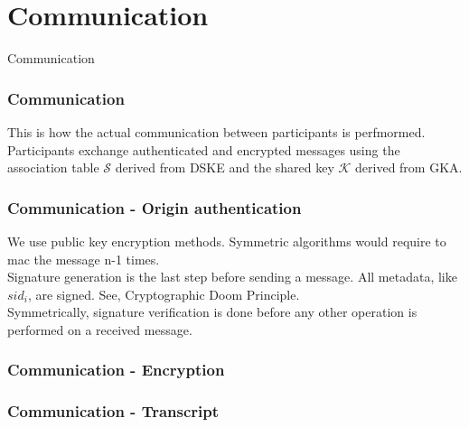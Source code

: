 \section{Communication}

\begin{frame}
\Huge{\centerline{Communication}}
\end{frame}

\begin{frame}
  \frametitle{Communication}
  This is how the actual communication between participants is perfmormed.\\[0.3cm]
  
  Participants exchange authenticated and encrypted messages using the association table $\mathcal{S}$ derived from DSKE and the shared key $\mathcal{K}$ derived from GKA.\\[0.3cm]
  
\end{frame}

\begin{frame}
  \frametitle{Communication - Origin authentication}
  We use public key encryption methods. Symmetric algorithms would require to mac the message n-1 times.\\[0.3cm]
  
  Signature generation is the last step before sending a message. All metadata, like $sid_i$, are signed. See, Cryptographic Doom Principle.\\[0.3cm]
  
  Symmetrically, signature verification is done before any other operation is performed on a received message.
\end{frame}

\begin{frame}
  \frametitle{Communication - Encryption}
\end{frame}


\begin{frame}
  \frametitle{Communication - Transcript}
\end{frame}